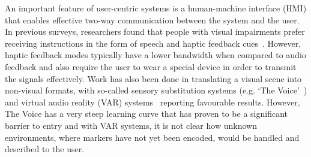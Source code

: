 \documentclass[sigconf, screen=true, anonymous=true]{acmart}
\begin{document}
An important feature of user-centric systems is a human-machine interface (HMI) that enables effective two-way communication between the system and the user.
In previous surveys, researchers found that people with visual impairments prefer receiving instructions in the form of speech and haptic feedback cues~\cite{khoo2016multimodal, ross2000wearable, vazquez2012helping}.
However, haptic feedback modes typically have a lower bandwidth when compared to audio feedback and also require the user to wear a special device in order to transmit the signals effectively.
Work has also been done in translating a visual scene into non-visual formats, with so-called sensory substitution systems (e.g. `The Voice'~\cite{meijer2010}) and virtual audio reality (VAR) systems~\cite{frauenberger2003} reporting favourable results.
However, The Voice has a very steep learning curve that has proven to be a significant barrier to entry and with VAR systems, it is not clear how unknown environments, where markers have not yet been encoded, would be handled and described to the user. 
\end{document}
